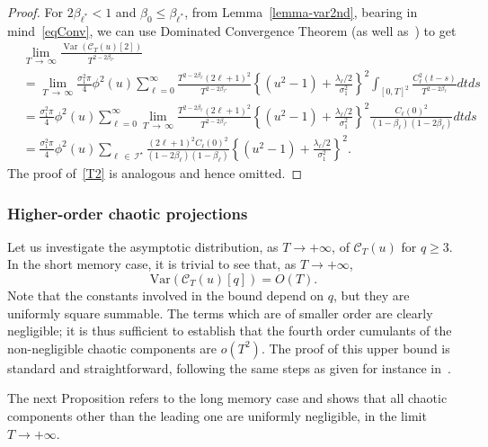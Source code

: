 \documentclass[AHL,Unicode,longabstracts,published]{cedram}
\newcommand{\clI}{\mathcal{I}}
\newcommand{\clC}{\mathcal{C}}
\DeclareMathOperator{\Var}{Var}
\begin{document}
\begin{proof}
For $2\beta_{\ell^*}<1$ and $\beta_0\le \beta_{\ell^*}$, from Lemma~\ref {lemma-var2nd}, bearing in mind~\eqref{eqConv}, we can use Dominated Convergence Theorem (as well as~\cite[Lemmas~4.7 and~4.8]{MRV:20}) to get
\begin{align*}
&\lim_{T\,\to\,\infty}\frac{\Var\left(\clC_T (u)[2]\right)}{T^{2-2\beta_{\ell^\star}}}\\
&= \lim_{T\,\to\,\infty} \frac{\sigma _{1}^{2}\pi }{4}\phi ^{2}(u)\sum_{\ell=0}^{\infty}\frac{T^{2-2\beta_{\ell}}(2\ell+1)^{2}}{T^{2-2\beta _{\ell^\star}}}\left\{\left(u^{2}-1\right)+\frac{\lambda _{\ell}/2}{\sigma_{1}^{2}}\right\}^2 \int_{[0,T]^2}\frac{C_{\ell }^{2}(t-s)}{T^{2-2\beta _{\ell }}}dtds\\
&= \frac{\sigma _{1}^{2}\pi }{4}\phi ^{2}(u)\sum_{\ell=0}^{\infty}\lim_{T\,\to\,\infty} \frac{T^{2-2\beta_{\ell}}(2\ell+1)^{2}}{T^{2-2\beta _{\ell^\star}}}\left\{\left(u^{2}-1\right)+\frac{\lambda _{\ell}/2}{\sigma_{1}^{2}}\right\}^2 \frac{C_{\ell }(0)^{2}}{(1-\beta_{\ell})(1-2\beta_{\ell})}dtds\\
&= \frac{\sigma _{1}^{2}\pi }{4}\phi ^{2}(u)\sum_{\ell\,\in\,\clI^\star}\frac{(2\ell+1)^{2}C_\ell(0)^2}{(1-2\beta_\ell)(1-\beta_\ell)}\left\{ \left(u^{2}-1\right)+\frac{\lambda _{\ell}/2}{\sigma_{1}^{2}}\right\}^2.
\end{align*}
The proof of~\eqref{T2} is analogous and hence omitted.
\end{proof}

\subsubsection{Higher-order chaotic projections}
\label{high}

Let us investigate the asymptotic distribution, as $T\to +\infty$, of $
\clC_T(u)$ for $q\ge 3$. In the short memory case, it is trivial to see that, as $T\to +\infty$,
\begin{equation*}
\text{Var}(\clC_T(u)[q]) = O(T).
\end{equation*}
Note that the constants involved in the bound depend on $q$, but they are uniformly square summable. The terms which are of smaller order are clearly negligible; it is thus sufficient to establish that the fourth order cumulants of the non-negligible chaotic components are $o(T^2)$. The proof of this upper bound is standard and straightforward, following the same steps as given for instance in~\cite{MRV:20}.

The next Proposition refers to the long memory case and shows that all chaotic components other than the leading one are uniformly negligible, in the limit $T\to +\infty$.
\end{document}
